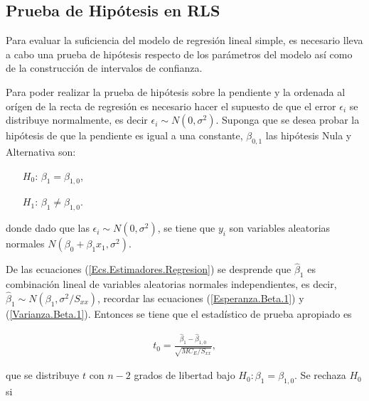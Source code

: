 \documentclass[12pt]{article}
\begin{document}
\subsection{Prueba de Hip\'otesis en RLS}

Para evaluar la suficiencia del modelo de regresi\'on lineal simple, es necesario lleva a cabo una prueba de hip\'otesis respecto de los par\'ametros del modelo as\'i como de la construcci\'on de intervalos de confianza.
\medskip 

Para poder realizar la prueba de hip\'otesis sobre la pendiente y la ordenada al or\'igen de la recta de regresi\'on es necesario hacer el supuesto de que el error $\epsilon_{i}$ se distribuye normalmente, es decir $\epsilon_{i} \sim N\left(0,\sigma^{2}\right)$. Suponga que se desea probar la hip\'otesis de que la pendiente es igual a una constante, $\beta_{0,1}$ las hip\'otesis Nula y Alternativa son:

\begin{centering}
\begin{itemize}
\item[$H_{0}$: ] $\beta_{1}=\beta_{1,0}$,

\item[$H_{1}$: ]$\beta_{1}\neq\beta_{1,0}$.

\end{itemize}
donde dado que las $\epsilon_{i} \sim N\left(0,\sigma^{2}\right)$, se tiene que $y_{i}$ son variables aleatorias normales $N\left(\beta_{0}+\beta_{1}x_{1},\sigma^{2}\right)$. 
\end{centering}

\medskip 

De las ecuaciones (\ref{Ecs.Estimadores.Regresion}) se desprende que $\hat{\beta}_{1}$ es combinaci\'on lineal de variables aleatorias normales independientes, es decir, $\hat{\beta}_{1}\sim N\left(\beta_{1},\sigma^{2}/S_{xx}\right)$, recordar las ecuaciones (\ref{Esperanza.Beta.1}) y (\ref{Varianza.Beta.1}).
Entonces se tiene que el estad\'istico de prueba apropiado es

\begin{eqnarray*}%
t_{0}=\frac{\hat{\beta}_{1}-\hat{\beta}_{1,0}}{\sqrt{MC_{E}/S_{xx}}},
\end{eqnarray*}

que se distribuye $t$ con $n-2$ grados de libertad bajo $H_{0}:\beta_{1}=\beta_{1,0}$. Se rechaza $H_{0}$ si 
\end{document}
